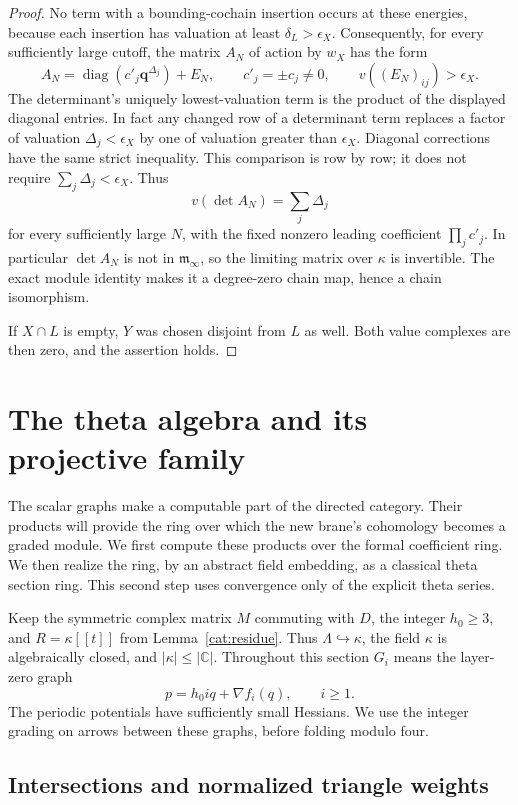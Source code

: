 \documentclass[11pt]{article}
\theoremstyle{definition}
\theoremstyle{remark}
\newcommand{\C}{\mathbb C}
\newcommand{\qnov}{\mathbf q}
\DeclareMathOperator{\diag}{diag}
\numberwithin{equation}{section}
\begin{document}
\begin{proof}
No term with a bounding-cochain insertion occurs at these energies,
because each insertion has valuation at least
\(\delta_L>\epsilon_X\).
Consequently, for every sufficiently large cutoff, the matrix \(A_N\)
of action by \(w_X\) has the form
\[
 A_N=\diag(c'_j\qnov^{\Delta_j})+E_N,
 \qquad c'_j=\pm c_j\ne0,\qquad
 v((E_N)_{ij})>\epsilon_X.
\]
The determinant's uniquely lowest-valuation term is the product of the
displayed diagonal entries.  In fact any changed row of a determinant
term replaces a factor of valuation \(\Delta_j<\epsilon_X\) by one of
valuation greater than \(\epsilon_X\).  Diagonal corrections have the
same strict inequality.  This comparison is row by row; it does not
require \(\sum_j\Delta_j<\epsilon_X\).
Thus
\[
 v(\det A_N)=\sum_j\Delta_j
\]
for every sufficiently large \(N\), with the fixed nonzero leading
coefficient \(\prod_j c'_j\).  In particular \(\det A_N\) is not in
\(\mathfrak m_\infty\), so the limiting matrix over \(\kappa\) is
invertible.  The exact module identity makes it a degree-zero chain
map, hence a chain isomorphism.

If \(X\cap L\) is empty, \(Y\) was chosen disjoint from \(L\) as well.
Both value complexes are then zero, and the assertion holds.
\end{proof}

\section{The theta algebra and its projective family}\label{theta:section}

The scalar graphs make a computable part of the directed category.  Their
products will provide the ring over which the new brane's cohomology becomes
a graded module.  We first compute these products over the formal coefficient
ring.  We then realize the ring, by an abstract field embedding, as a classical
theta section ring.  This second step uses convergence only of the explicit
theta series.

Keep the symmetric complex matrix $M$ commuting with $D$, the integer
$h_0\geq3$, and $R=\kappa[[t]]$ from Lemma~\ref{cat:residue}.  Thus
$\Lambda\hookrightarrow\kappa$, the field $\kappa$ is algebraically closed,
and $|\kappa|\leq|\C|$.  Throughout this section $G_i$ means the layer-zero
graph
\[
 p=h_0i q+\nabla f_i(q),\qquad i\geq1.
\]
The periodic potentials have sufficiently small Hessians.  We use the
integer grading on arrows between these graphs, before folding modulo four.

\subsection{Intersections and normalized triangle weights}
\end{document}
